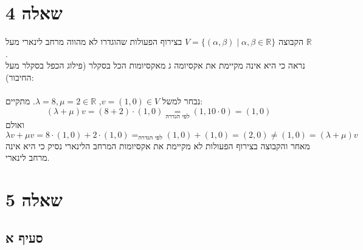 \documentclass{article}
\newcommand\underrel[2]{\mathrel{\mathop{#2}\limits_{#1}}}
\DeclareMathOperator*{\equals}{=}
\begin{document}
\pagebreak

\section*{שאלה 4}

הקבוצה $V=\{(\alpha, \beta)\;|\; \alpha, \beta \in \mathbb{R}\}$
בצירוף הפעולות שהוגדרו לא מהווה מרחב לינארי מעל $\mathbb{R}$.\\
נראה כי היא אינה מקיימת את אקסיומה ג מאקסיומות הכל בסקלר (פילוג הכפל בסקלר מעל החיבור):
\\\\
נבחר למשל $v=(1,0)\in V$, $\lambda=8, \mu = 2 \in \mathbb{R}$.
מתקיים:
\[
    (\lambda + \mu)v =
    (8+2)\cdot (1,0) \underrel{\text{לפי הגדרה}}{=}
    (1,10\cdot 0) =(1,0)
\]
ואולם
\[
    \lambda v +\mu v =
    8\cdot (1,0) + 2\cdot (1,0) \equals_{\text{לפי הגדרה}}
    (1,0) + (1,0) = (2,0) \ne (1,0) = (\lambda + \mu)v
\]
מאחר והקבוצה בצירוף הפעולות לא מקיימת את אקסיומות המרחב הלינארי נסיק כי היא אינה מרחב לינארי.

\section*{שאלה 5}

\subsection*{סעיף א}
\end{document}
